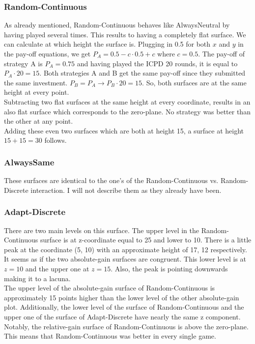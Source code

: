 \documentclass[11pt]{article}
\begin{document}
\subsubsection*{Random-Continuous}
		As already mentioned, Random-Continuous behaves like AlwaysNeutral by having played several times.
		This results to having a completely flat surface.
		We can calculate at which height the surface is.
		Plugging in 0.5 for both $x$ and $y$ in the pay-off equations, we get $P_A = 0.5 - c \cdot 0.5 + c$ where $c = 0.5$.
		The pay-off of strategy A is $P_A = 0.75$ and having played the ICPD 20 rounds, it is equal to $P_A \cdot 20 = 15$.
		Both strategies A and B get the same pay-off since they submitted the same investment.
		$P_B = P_A \rightarrow P_B \cdot 20 = 15$.
		So, both surfaces are at the same height at every point.\\

		Subtracting two flat surfaces at the same height at every coordinate, results in an also flat surface which corresponds to the zero-plane.
		No strategy was better than the other at any point.\\

		Adding these even two surfaces which are both at height 15, a surface at height $15 + 15 = 30$ follows.\\


\subsubsection*{AlwaysSame}
		These surfaces are identical to the one's of the Random-Continuous vs. Random-Discrete interaction.
		I will not describe them as they already have been.\\
	

\subsubsection*{Adapt-Discrete}
		There are two main levels on this surface.
		The upper level in the Random-Continuous surface is at z-coordinate equal to 25 and lower to 10.
		There is a little peak at the coordinate (5, 10) with an approximate height of 17, 12 respectively.\\
		It seems as if the two absolute-gain surfaces are congruent.
		This lower level is at $z = 10$ and the upper one at $z = 15$.
		Also, the peak is pointing downwards making it to a lacuna.\\

		The upper level of the absolute-gain surface of Random-Continuous is approximately 15 points higher than the lower level of the other absolute-gain plot.
		Additionally, the lower level of the surface of Random-Continuous and the upper one of the surface of Adapt-Discrete have nearly the same z component.
		Notably, the relative-gain surface of Random-Continuous is above the zero-plane.
		This means that Random-Continuous was better in every single game.\\
\end{document}
